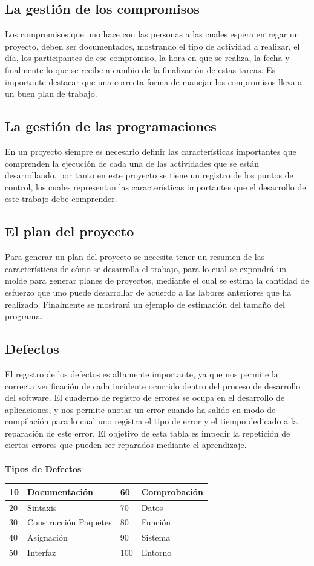 \documentclass[a4paper,12pt,openany,oneside]{book}
\begin{document}
\subsection{La gestión de los compromisos}
Los compromisos que uno hace con las personas a las cuales espera entregar un proyecto, deben ser documentados, mostrando el tipo de actividad a realizar, el día, los participantes de ese compromiso, la hora en que se realiza, la fecha y finalmente lo que se recibe a cambio de la finalización de estas tareas. Es importante destacar que una correcta forma de manejar los compromisos lleva a un buen plan de trabajo.
\subsection{La gestión de las programaciones}
En un proyecto siempre es necesario definir las características importantes que comprenden la ejecución de cada una de las actividades que se están desarrollando, por tanto en este proyecto se tiene un registro de los puntos de control, los cuales representan las características importantes que el desarrollo de este trabajo debe comprender.
\subsection{El plan del proyecto}
Para generar un plan del proyecto se necesita tener un resumen de las características de cómo se desarrolla el trabajo, para lo cual se expondrá un molde para generar planes de proyectos, mediante el cual se estima la cantidad de esfuerzo que uno puede desarrollar de acuerdo a las labores anteriores que ha realizado. Finalmente se mostrará un ejemplo de estimación del tamaño del programa.
\subsection{Defectos}
El registro de los defectos es altamente importante, ya que nos permite la correcta verificación de cada incidente ocurrido dentro del proceso de desarrollo del software. El cuaderno de registro de errores se ocupa en el desarrollo de aplicaciones, y nos permite anotar un error cuando ha salido en modo de compilación para lo cual uno registra el tipo de error y el tiempo dedicado a la reparación de este error. El objetivo de esta tabla es impedir la repetición de ciertos errores que pueden ser reparados mediante el aprendizaje.\\
\\
\textbf{Tipos de Defectos}\\
\begin{tabular}{| l | l | l | l |}
\hline
10 & Documentación         & 60 & Comprobación\\
\hline
20 & Sintaxis              & 70 & Datos\\
\hline
30 & Construcción Paquetes & 80 & Función\\
\hline
40 & Asignación            & 90 & Sistema\\
\hline
50 & Interfaz              & 100 & Entorno\\
\hline
\end{tabular}
\end{document}
